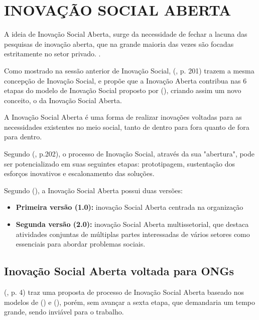 \section {INOVAÇÃO SOCIAL ABERTA}
\label{inovacaosocialaberta}

A ideia de Inovação Social Aberta, surge da necessidade de fechar a lacuna das pesquisas de inovação aberta, que na grande maioria das vezes são focadas estritamente no setor privado. \cite{chesbrough2014}.

Como mostrado na sessão anterior de Inovação Social, \citeauthor{chesbrough2014} (\citeyear{chesbrough2014}, p. 201) trazem a mesma concepção de Inovação Social, e propõe que a Inovação Aberta contribua nas 6 etapas do modelo de Inovação Social proposto por \citeauthor{murray2010} (\citeyear{murray2010}), criando assim um novo conceito, o da Inovação Social Aberta. 

A Inovação Social Aberta é uma forma de realizar inovações voltadas para as necessidades existentes no meio social, tanto de dentro para fora quanto de fora para dentro. 

Segundo \citeauthor{chesbrough2014} (\citeyear{chesbrough2014}, p.202),
o processo de Inovação Social, através da sua "abertura", pode ser potencializado em suas seguintes etapas: prototipagem, sustentação dos esforços inovativos e escalonamento das soluções.
\par\vspace{1\baselineskip}

Segundo \citeauthor{gegenhuber2023} (\citeyear{gegenhuber2023}), a Inovação Social Aberta possui duas versões:
\begin{itemize}
    \item \textbf{Primeira versão (1.0):} inovação Social Aberta centrada na organização
    \item \textbf{Segunda versão (2.0):} inovação Social Aberta multissetorial, que  destaca  atividades  conjuntas  de  múltiplas  partes  interessadas  de  vários  setores  como  essenciais  para  abordar  problemas  sociais.
\end{itemize} 

\subsection{Inovação Social Aberta voltada para ONGs}

\citeauthor{gama2023} (\citeyear{gama2023}, p. 4) traz uma proposta de processo de Inovação Social Aberta baseado nos modelos de \citeauthor{chesbrough2014} (\citeyear{chesbrough2014}) e \citeauthor{murray2010} (\citeyear{murray2010}), porém, sem avançar a sexta etapa, que demandaria um tempo grande, sendo inviável para o trabalho. 

